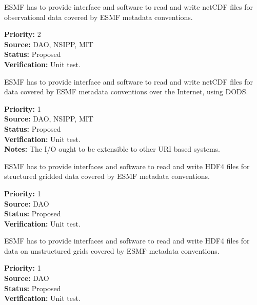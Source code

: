 
ESMF has to provide interface and software to read and write netCDF
files for observational data  covered by ESMF metadata conventions. 

\begin{reqlist}
{\bf Priority:} 2 \\
{\bf Source:} DAO, NSIPP, MIT \\
{\bf Status:} Proposed \\
{\bf Verification:} Unit test. \\
\end{reqlist}



ESMF has to provide interface and software to read and write netCDF
files for data covered by ESMF metadata conventions over the Internet, 
using DODS.

\begin{reqlist}
{\bf Priority:} 1 \\
{\bf Source:} DAO, NSIPP, MIT \\
{\bf Status:} Proposed \\
{\bf Verification:} Unit test. \\
{\bf Notes:} The I/O ought to be extensible to other URI based
systems. \\
\end{reqlist}


ESMF has to provide interfaces and software to read and write HDF4 files for 
structured gridded data covered by ESMF metadata conventions.
 

\begin{reqlist}
{\bf Priority:} 1 \\
{\bf Source:} DAO \\
{\bf Status:} Proposed \\
{\bf Verification:} Unit test. \\
\end{reqlist}




ESMF has to provide interfaces and software to read and write HDF4
files for data on unstructured grids covered by ESMF metadata conventions.
 

\begin{reqlist}
{\bf Priority:} 1 \\
{\bf Source:} DAO \\
{\bf Status:} Proposed \\
{\bf Verification:} Unit test. \\
\end{reqlist}

